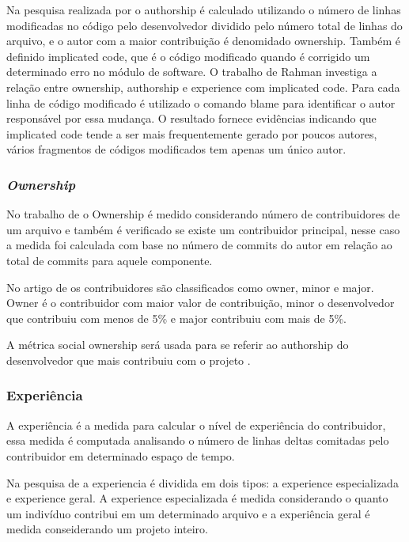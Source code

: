 Na pesquisa realizada por  o authorship é calculado utilizando o número de linhas modificadas no código pelo desenvolvedor dividido pelo número total de linhas do arquivo, e o autor com a maior contribuição é denomidado ownership. Também é definido implicated code, que é o código modificado quando é corrigido um determinado erro no módulo de software. O trabalho de Rahman investiga a relação entre ownership, authorship e experience com implicated code. Para cada linha de código modificado é utilizado o comando blame para identificar o autor responsável por essa mudança. O resultado fornece evidências indicando que implicated code tende a ser mais frequentemente gerado por poucos autores, vários fragmentos de códigos modificados tem apenas um único autor.

\subsubsection{\textit{Ownership}}
No trabalho de  o Ownership é medido considerando número de contribuidores de um arquivo e também é verificado se existe um contribuidor principal, nesse caso a medida foi calculada com base no número de commits do autor em relação ao total de commits para aquele componente.

No artigo de  os contribuidores são classificados como owner, minor e major. Owner é o contribuidor com maior valor de contribuição, minor o desenvolvedor que contribuiu com menos de 5\% e major contribuiu com mais de 5\%.

A métrica social ownership será usada para se referir ao authorship do desenvolvedor que mais contribuiu com o projeto \cite{Thongtanunam}. 

\subsubsection{Experiência}
A experiência é a medida para calcular o nível de experiência do contribuidor, essa medida é computada analisando o número de linhas \cite{Rahman2011} deltas comitadas pelo contribuidor em determinado espaço de tempo.

Na pesquisa de  a experiencia é dividida em dois tipos: a experience especializada e experience geral. A experience especializada é medida considerando o quanto um indivíduo contribui em um determinado arquivo e a experiência geral é medida conseiderando um projeto inteiro.

